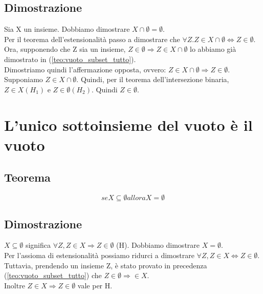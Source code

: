 \documentclass[12pt]{article}
\begin{document}
\subsection{Dimostrazione}
Sia X un insieme. Dobbiamo dimostrare $X \cap \emptyset = \emptyset$.\\
Per il teorema dell'estensionalità passo a dimostrare che $\forall Z. Z \in X \cap \emptyset \Leftrightarrow Z \in \emptyset$. Ora, supponendo che Z sia un insieme, $Z \in \emptyset \Rightarrow Z \in X \cap \emptyset$ lo abbiamo già dimostrato in (\ref{teo:vuoto_subset_tutto}).\\
Dimostriamo quindi l'affermazione opposta, ovvero: $Z \in X \cap \emptyset \Rightarrow Z \in \emptyset$. Supponiamo $Z \in X \cap \emptyset$. Quindi, per il teorema dell'intersezione binaria, $Z \in X (H_1) \text{ e } Z \in \emptyset (H_2)$. Quindi $Z \in \emptyset$.
\section{L'unico sottoinsieme del vuoto è il vuoto}
\subsection{Teorema}
\begin{equation}
    se X \subseteq \emptyset allora X = \emptyset \label{teo:vuoto_unico_subset_vuoto}
\end{equation}
\subsection{Dimostrazione}
$X \subseteq \emptyset$ significa $\forall Z, Z \in X \Rightarrow Z \in \emptyset$ (H). Dobbiamo dimostrare $X = \emptyset$.\\
Per l'assioma di estensionalità possiamo ridurci a dimostrare $\forall Z, Z \in X \Leftrightarrow Z \in \emptyset$. Tuttavia, prendendo un insieme Z, è stato provato in precedenza (\ref{teo:vuoto_subset_tutto}) che $Z \in \emptyset \Rightarrow \in X$.\\
Inoltre $Z \in X \Rightarrow Z \in \emptyset$ vale per H.
\end{document}
